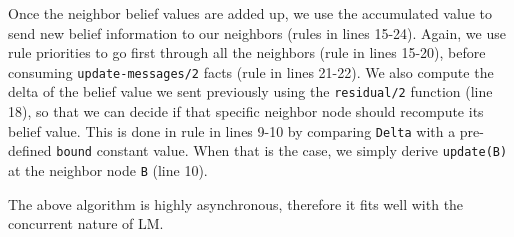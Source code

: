 Once the neighbor belief values are added up, we use the accumulated value to
send new belief information to our neighbors (rules in lines 15-24). Again, we
use rule priorities to go first through all the neighbors (rule in lines 15-20),
before consuming \texttt{update-messages/2} facts (rule in lines 21-22). We also
compute the delta of the belief value we sent previously using the
\texttt{residual/2} function (line 18), so that we can decide if that specific
neighbor node should recompute its belief value. This is done in rule in lines
9-10 by comparing \texttt{Delta} with a pre-defined \texttt{bound} constant
value. When that is the case, we simply derive \texttt{update(B)} at the
neighbor node \texttt{B} (line 10).

The above algorithm is highly asynchronous, therefore it fits well with the
concurrent nature of LM.
